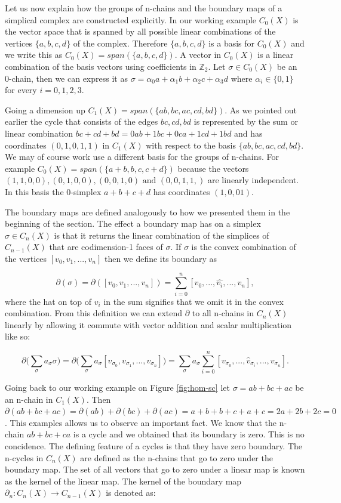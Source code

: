 Let us now explain how the groups of n-chains and the boundary maps of a simplical complex are constructed explicitly. In our working example $C_0(X)$ is the vector space that is spanned by all possible linear combinations of the vertices $\{a, b, c, d\}$ of the complex. Therefore $\{a, b, c, d\}$ is a basis for $C_0(X)$ and we write this as $C_0(X) = span(\{a, b, c, d\})$. A vector in $C_0(X)$ is a linear combination of the basis vectors using coefficients in $\mathbb{Z}_2$. Let $\sigma \in C_0(X)$ be an 0-chain, then we can express it as $\sigma  = \alpha_0a + \alpha_1b + \alpha_2c + \alpha_3d$ where $\alpha_i \in \{0 ,1\}$ for every $i = 0, 1, 2, 3$.

Going a dimension up $C_1(X) = span(\{ab, bc, ac, cd, bd\})$. As we pointed out earlier the cycle that consists of the edges $bc, cd, bd$ is represented by the sum or linear combination $bc + cd + bd = 0ab + 1bc + 0ca + 1cd + 1bd$ and has coordinates $(0, 1, 0, 1, 1)$ in $C_1(X)$ with respect to the basis $\{ab, bc, ac, cd, bd\}$. We may of course work use a different basis for the groups of n-chains. For example $C_0(X) = span(\{a + b, b, c, c + d\})$ because the vectors $(1, 1, 0, 0), (0, 1, 0, 0), (0, 0, 1, 0) \text { and } (0, 0, 1, 1,)$ are linearly independent. In this basis the 0-simplex $a + b + c + d$ has coordinates $(1, 0, 0 1)$.

The boundary maps are defined analogously to how we presented them in the beginning of the section. The effect a boundary map has on a simplex $\sigma \in C_n(X)$ is that it returns the linear combination of the simplices of $C_{n-1}(X)$ that are codimension-1 faces of $\sigma$. If $\sigma$ is the convex  combination of the vertices $[v_0, v_1, ..., v_n]$ then we define its boundary as

$$ \partial(\sigma) = \partial([v_0, v_1, ..., v_n]) = \sum_{i=0}^{n}[v_0, ... , \hat{v_i}, ..., v_n] ,$$
where the hat on top of $v_i$ in the sum signifies that we omit it in the convex combination. From this definition we can extend $\partial$ to all n-chains in $C_n(X)$ linearly by allowing it commute with vector addition and scalar multiplication like so:

$$ \partial\bigg(\sum_{\sigma}a_{\sigma}\sigma\bigg) = \partial\bigg(\sum_{\sigma}{a_{\sigma}[v_{\sigma_0}, v_{\sigma_1}, ..., v_{\sigma_n}]}\bigg) = \sum_{\sigma}{a_{\sigma} \sum_{i=0}^{n}[v_{\sigma_0},..., \hat{v}_{\sigma_i}, ..., v_{\sigma_n}]} .$$

Going back to our working example on Figure \ref{fig:hom-sc} let $\sigma = ab + bc + ac$ be an n-chain in $C_1(X)$. Then $\partial(ab + bc + ac) = \partial(ab) + \partial(bc) + \partial(ac) = a + b + b + c + a + c = 2a + 2b + 2c = 0$. This examples allows us to observe an important fact. We know that the n-chain $ab + bc + ca$ is a cycle and we obtained that its boundary is zero. This is no concidence. The defining feature of a cycles is that they have zero boundary. The n-cycles in $C_{n}(X)$ are defined as the n-chains that go to zero under the boundary map. The set of all vectors that go to zero under a linear map is known as the kernel of the linear map. The kernel of the boundary map $\partial_n : C_{n}(X) \to C_{n-1}(X)$ is denoted as:

